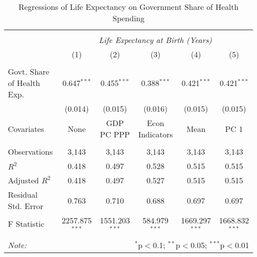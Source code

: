 \begin{table}[!htbp] \centering
  \caption{Regressions of Life Expectancy on Government Share of Health Spending \label{main_regs}}
\begin{tabular}{@{\extracolsep{5pt}}lccccc}
\\[-1.8ex]\hline
\hline \\[-1.8ex]
& \multicolumn{5}{c}{\textit{Life Expectancy at Birth (Years)}} \
\cr \
\\[-1.8ex] & (1) & (2) & (3) & (4) & (5) \\
\hline \\[-1.8ex]
 Govt. Share of Health Exp. & 0.647$^{***}$ & 0.455$^{***}$ & 0.388$^{***}$ & 0.421$^{***}$ & 0.421$^{***}$ \\
  & (0.014) & (0.015) & (0.016) & (0.015) & (0.015) \\
 Covariates & None & GDP PC PPP & Econ Indicators & Mean & PC 1 \\
\hline \\[-1.8ex]
 Observations & 3,143 & 3,143 & 3,143 & 3,143 & 3,143 \\
 $R^2$ & 0.418 & 0.497 & 0.528 & 0.515 & 0.515 \\
 Adjusted $R^2$ & 0.418 & 0.497 & 0.527 & 0.515 & 0.515 \\
 Residual Std. Error & 0.763 & 0.710 & 0.688 & 0.697 & 0.697  \\
 F Statistic & 2257.875$^{***}$  & 1551.203$^{***}$  & 584.979$^{***}$  & 1669.297$^{***}$  & 1668.832$^{***}$  \\
\hline
\hline \\[-1.8ex]
\textit{Note:} & \multicolumn{5}{r}{$^{*}$p$<$0.1; $^{**}$p$<$0.05; $^{***}$p$<$0.01} \\
\end{tabular}
\end{table}